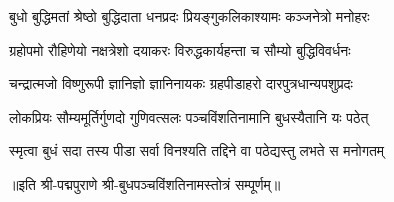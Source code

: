 

\twolineshloka
{बुधो बुद्धिमतां श्रेष्ठो बुद्धिदाता धनप्रदः}
{प्रियङ्गुकलिकाश्यामः कञ्जनेत्रो मनोहरः}

\twolineshloka
{ग्रहोपमो रौहिणेयो नक्षत्रेशो दयाकरः}
{विरुद्धकार्यहन्ता च सौम्यो बुद्धिविवर्धनः}

\twolineshloka
{चन्द्रात्मजो विष्णुरूपी ज्ञानिज्ञो ज्ञानिनायकः}
{ग्रहपीडाहरो दारपुत्रधान्यपशुप्रदः}

\twolineshloka
{लोकप्रियः सौम्यमूर्तिर्गुणदो गुणिवत्सलः}
{पञ्चविंशतिनामानि बुधस्यैतानि यः पठेत्}

\twolineshloka
{स्मृत्वा बुधं सदा तस्य पीडा सर्वा विनश्यति}
{तद्दिने वा पठेद्यस्तु लभते स मनोगतम्}

॥इति श्री-पद्मपुराणे श्री-बुधपञ्चविंशतिनामस्तोत्रं सम्पूर्णम्॥
